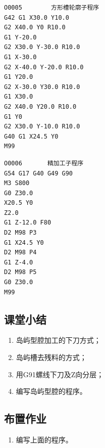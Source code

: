 \begin{lstlisting}
O0005        方形槽轮廓子程序
G42 G1 X30.0 Y10.0
G2 X40.0 Y0 R10.0
G1 Y-20.0 
G2 X30.0 Y-30.0 R10.0
G1 X-30.0 
G2 X-40.0 Y-20.0 R10.0
G1 Y20.0 
G2 X-30.0 Y30.0 R10.0
G1 X30.0 
G2 X40.0 Y20.0 R10.0
G1 Y0 
G2 X30.0 Y-10.0 R10.0
G40 G1 X24.5 Y0
M99
\end{lstlisting}

\begin{lstlisting}
O0006       精加工子程序
G54 G17 G40 G49 G90 
M3 S800
G0 Z30.0
X20.5 Y0
Z2.0
G1 Z-12.0 F80
D2 M98 P3
G1 X24.5 Y0
D2 M98 P4
G1 Z-4.0
D2 M98 P5
G0 Z30.0
M99
\end{lstlisting}

\subsection{课堂小结}
\begin{enumerate}[1、]
\item 岛屿型腔加工的下刀方式；
\item 岛屿槽去残料的方式；
\item 用G91螺线下刀及Z向分层；
\item 编写岛屿型腔的程序。
\end{enumerate}

\vfill
\subsection{布置作业}
\begin{enumerate}[1、]
	\item 编写上面的程序。
\end{enumerate}
\vfill